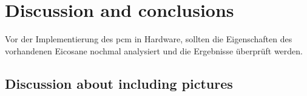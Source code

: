 \chapter{Discussion and conclusions}
\label{chap:conclusion}


Vor der Implementierung des \ac{pcm} in Hardware, sollten die Eigenschaften des vorhandenen Eicosane nochmal analysiert und die Ergebnisse überprüft werden.

\section{Discussion about including pictures}
